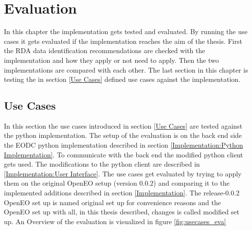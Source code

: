 \documentclass[draft,final]{vutinfth} %
\begin{document}
\chapter{Evaluation}\label{Evaluation}
In this chapter the implementation gets tested and evaluated. By running the use cases it gets evaluated if the implementation reaches the aim of the thesis. First the RDA data identification recommendations are checked with the implementation and how they apply or not need to apply. Then the two implementations are compared with each other. The last section in this chapter is testing the in section \ref{Use Cases} defined use cases against the implementation. 


 

\section{Use Cases}\label{Evaluation:Use Cases}
In this section the use cases introduced in section \ref{Use Cases} are tested against the python implementation. The setup of the evaluation is on the back end side the EODC python implementation described in section \ref{Implementation:Python Implementation}. To communicate with the back end the modified python client gets used. The modifications to the python client are described in \ref{Implementation:User Interface}. The use cases get evaluated by trying to apply them on the original OpenEO setup (version 0.0.2) and comparing it to the implemented additions described in section \ref{Implementation}. The release-0.0.2 OpenEO set up is named original set up for convenience reasons and the OpenEO set up with all, in this thesis described, changes is called modified set up. An Overview of the evaluation is visualized in figure \ref{fig:usecases_eva} 

\end{document}

